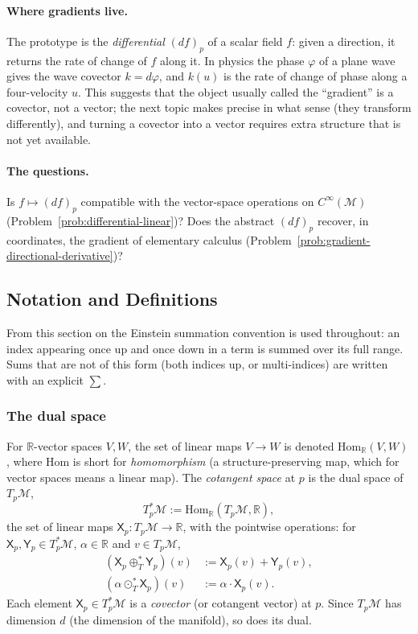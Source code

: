 \documentclass[11pt]{article}
\newcommand{\TpM}{T_p\mathcal M}
\newcommand{\TpsM}{T_p^*\mathcal M}
\newcommand{\Cinf}{C^\infty(\mathcal M)}
\begin{document}
\paragraph{Where gradients live.}
The prototype is the \emph{differential} $(df)_p$ of a scalar field $f$: given a direction, it returns the rate of change of $f$ along it. In physics the phase $\varphi$ of a plane wave gives the wave covector $k=d\varphi$, and $k(u)$ is the rate of change of phase along a four-velocity $u$. This suggests that the object usually called the ``gradient'' is a covector, not a vector; the next topic makes precise in what sense (they transform differently), and turning a covector into a vector requires extra structure that is not yet available.

\paragraph{The questions.}
Is $f\mapsto(df)_p$ compatible with the vector-space operations on $\Cinf$ (Problem~\ref{prob:differential-linear})? Does the abstract $(df)_p$ recover, in coordinates, the gradient of elementary calculus (Problem~\ref{prob:gradient-directional-derivative})?

\subsection*{Notation and Definitions}

\noindent From this section on the Einstein summation convention is used throughout: an index appearing once up and once down in a term is summed over its full range. Sums that are not of this form (both indices up, or multi-indices) are written with an explicit $\sum$.

\subsubsection*{The dual space}
For $\mathbb R$-vector spaces $V,W$, the set of linear maps $V\to W$ is denoted $\mathrm{Hom}_{\mathbb R}(V,W)$, where $\mathrm{Hom}$ is short for \emph{homomorphism} (a structure-preserving map, which for vector spaces means a linear map). The \emph{cotangent space} at $p$ is the dual space of $\TpM$,
\[
\TpsM:=\mathrm{Hom}_{\mathbb R}(\TpM,\mathbb R),
\]
the set of linear maps $\mathsf X_p:\TpM\to\mathbb R$, with the pointwise operations: for $\mathsf X_p,\mathsf Y_p\in\TpsM$, $\alpha\in\mathbb R$ and $v\in\TpM$,
\begin{align*}
(\mathsf X_p\oplus_T^*\mathsf Y_p)(v)&:=\mathsf X_p(v)+\mathsf Y_p(v),\\
(\alpha\odot_T^*\mathsf X_p)(v)&:=\alpha\cdot\mathsf X_p(v).
\end{align*}
Each element $\mathsf X_p\in\TpsM$ is a \emph{covector} (or cotangent vector) at $p$. Since $\TpM$ has dimension $d$ (the dimension of the manifold), so does its dual.
\end{document}
